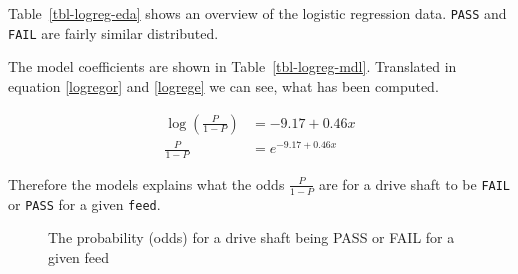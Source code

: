 \documentclass[
  a4paper,
]{scrbook}
\begin{document}
Table~\ref{tbl-logreg-eda} shows an overview of the logistic regression
data. \texttt{PASS} and \texttt{FAIL} are fairly similar distributed.

\begin{table}

\caption{\label{tbl-logreg-mdl}The modeling of the logisitic regression
data.}


\end{table}%

The model coefficients are shown in Table~\ref{tbl-logreg-mdl}.
Translated in equation \eqref{logregor} and \eqref{logrege} we can see,
what has been computed.

\begin{align}
\log(\frac{P}{1-P}) &= -9.17 + 0.46x \label{logregor} \\
\frac{P}{1-P} &= e^{-9.17 + 0.46x} \label{logrege}
\end{align}

Therefore the models explains what the odds \(\frac{P}{1-P}\) are for a
drive shaft to be \texttt{FAIL} or \texttt{PASS} for a given
\texttt{feed}.

\begin{figure}[H]


\caption{\label{fig-logreg-mdl}The probability (odds) for a drive shaft
being PASS or FAIL for a given feed}

\end{figure}%
\end{document}
